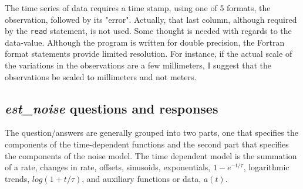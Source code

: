 \documentclass[12pt]{amsart}
\begin{document}
The time series of data requires a time stamp, using one of 5 formats, the observation, followed by its "error". Actually,
that last column, although required by the \texttt{read} statement, is not used. Some thought is needed with
regards to the data-value.  Although the program is written for double precision, the Fortran format statements
provide limited resolution. For instance, if the actual scale of the variations in the observations are a few
millimeters, I suggest that the observations be scaled to millimeters and not meters. 


\subsection{\textit{est\_noise} questions and responses}

The question/answers are generally grouped into two parts, one that specifies the components of the time-dependent functions and the second part that specifies the components of the noise model.  The time dependent model is the summation of a rate, changes in rate, offsets, sinusoids, exponentials, $1 - e^{-t/{\tau}}$, logarithmic trends,
$log(1 + {t/{\tau}})$, and auxiliary functions or data, $a(t)$.
\end{document}
